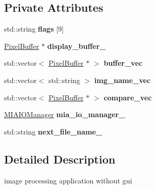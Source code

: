 \subsection*{Private Attributes}
\begin{DoxyCompactItemize}
\item 
std\+::string {\bfseries flags} \mbox{[}9\mbox{]}
\item 
\hyperlink{classimage__tools_1_1PixelBuffer}{Pixel\+Buffer} $\ast$ {\bfseries display\+\_\+buffer\+\_\+}\hypertarget{classimage__tools_1_1MIACmdApp_a28e465144094f88d0db6bc596a94bb2b}{}\label{classimage__tools_1_1MIACmdApp_a28e465144094f88d0db6bc596a94bb2b}

\item 
std\+::vector$<$ \hyperlink{classimage__tools_1_1PixelBuffer}{Pixel\+Buffer} $\ast$ $>$ {\bfseries buffer\+\_\+vec}\hypertarget{classimage__tools_1_1MIACmdApp_a179bf50782f4a0bfa2fa03fc09dfdc00}{}\label{classimage__tools_1_1MIACmdApp_a179bf50782f4a0bfa2fa03fc09dfdc00}

\item 
std\+::vector$<$ std\+::string $>$ {\bfseries img\+\_\+name\+\_\+vec}\hypertarget{classimage__tools_1_1MIACmdApp_abdfd222ce0ebb08ba8d3839d0dca5b75}{}\label{classimage__tools_1_1MIACmdApp_abdfd222ce0ebb08ba8d3839d0dca5b75}

\item 
std\+::vector$<$ \hyperlink{classimage__tools_1_1PixelBuffer}{Pixel\+Buffer} $\ast$ $>$ {\bfseries compare\+\_\+vec}\hypertarget{classimage__tools_1_1MIACmdApp_a3e8648ada7a876c909a134fa2efe3efd}{}\label{classimage__tools_1_1MIACmdApp_a3e8648ada7a876c909a134fa2efe3efd}

\item 
\hyperlink{classimage__tools_1_1MIAIOManager}{M\+I\+A\+I\+O\+Manager} {\bfseries mia\+\_\+io\+\_\+manager\+\_\+}\hypertarget{classimage__tools_1_1MIACmdApp_ac7f45dcb57324b0531cdbd5d0ad0a6cd}{}\label{classimage__tools_1_1MIACmdApp_ac7f45dcb57324b0531cdbd5d0ad0a6cd}

\item 
std\+::string {\bfseries next\+\_\+file\+\_\+name\+\_\+}\hypertarget{classimage__tools_1_1MIACmdApp_a80231f9e545a5b698a736a0f688e6337}{}\label{classimage__tools_1_1MIACmdApp_a80231f9e545a5b698a736a0f688e6337}

\end{DoxyCompactItemize}


\subsection{Detailed Description}
image processing application without gui 

